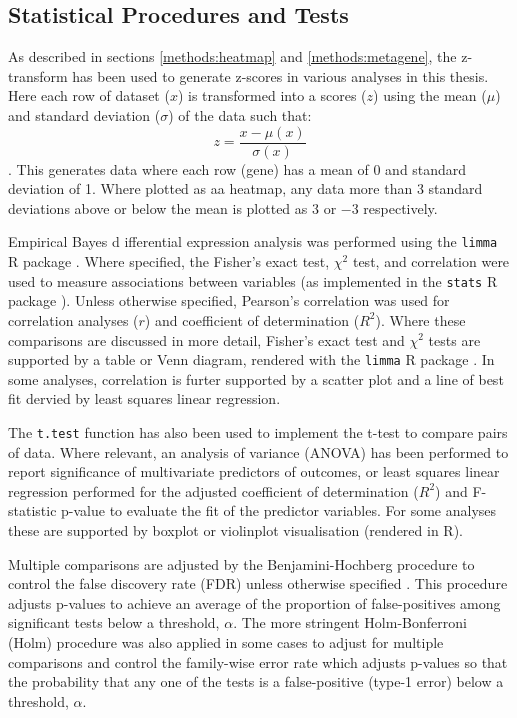 \subsection{Statistical Procedures and Tests}

As described in sections \ref{methods:heatmap} and \ref{methods:metagene}, the z-transform has been used to generate z-scores in various analyses in this thesis. Here each row of dataset ($x$) is transformed into a scores ($z$) using the mean ($\mu$) and standard deviation ($\sigma$) of the data such that: $$ z = \frac{x - \mu(x)}{\sigma(x)} $$. This generates data where each row (gene) has a mean of 0 and standard deviation of 1. Where plotted as aa heatmap, any data more than 3 standard deviations above or below the mean is plotted as $3$ or $-3$ respectively.

Empirical Bayes d ifferential expression analysis was performed using the \texttt{limma} R package \citep{limma}. Where specified, the Fisher's exact test, $\chi^2$ test, and correlation were used to measure associations between variables (as implemented in the \texttt{stats} R package \citep{R_core}). Unless otherwise specified, Pearson's correlation was used for correlation analyses ($r$) and coefficient of determination ($R^2$). Where these comparisons are discussed in more detail, Fisher's exact test and $\chi^2$ tests are supported by a table or Venn diagram, rendered with the \texttt{limma} R package \citep{limma}. In some analyses, correlation is furter supported by a scatter plot and a line of best fit dervied by least squares linear regression. 

The \texttt{t.test} function \citep{R_core} has also been used to implement the t-test to compare pairs of data. Where relevant, an analysis of variance (ANOVA) has been performed to report significance of multivariate predictors of outcomes, or least squares linear regression performed for the adjusted coefficient of determination ($R^2$) and F-statistic p-value to evaluate the fit of the predictor variables. For some analyses these are supported by boxplot or violinplot visualisation (rendered in R).

Multiple comparisons are adjusted by the Benjamini-Hochberg procedure to control the false discovery rate (FDR) unless otherwise specified \citep{fdr1995}. This procedure adjusts p-values to achieve an average of the proportion of false-positives among significant tests below a threshold, $\alpha$. The more stringent Holm-Bonferroni (Holm) procedure \citep{Holm1979} was also applied in some cases to adjust for multiple comparisons and control the family-wise error rate which adjusts p-values so that the probability that any one of the tests is a false-positive (type-1 error) below a threshold, $\alpha$.


